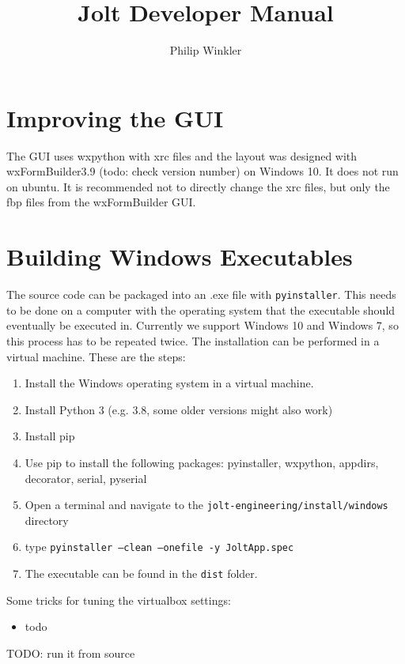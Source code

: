 \documentclass[]{article}
\title{Jolt Developer Manual}
\author{Philip Winkler}
\begin{document}
\maketitle

\section{Improving the GUI}
The GUI uses wxpython with xrc files and the layout was designed with wxFormBuilder3.9 (todo: check version number) on Windows 10. It does not run on ubuntu. It is recommended not to directly change the xrc files, but only the fbp files from the wxFormBuilder GUI.

\section{Building Windows Executables}
The source code can be packaged into an .exe file with \texttt{pyinstaller}. This needs to be done on a computer with the operating system that the executable should eventually be executed in. Currently we support Windows 10 and Windows 7, so this process has to be repeated twice. The installation can be performed in a virtual machine. 
These are the steps:
\begin{enumerate}
	\item Install the Windows operating system in a virtual machine.
	\item Install Python 3 (e.g. 3.8, some older versions might also work)
	\item Install pip
	\item Use pip to install the following packages: pyinstaller, wxpython, appdirs, decorator, serial, pyserial
	\item Open a terminal and navigate to the \texttt{jolt-engineering/install/windows} directory
	\item type \texttt{pyinstaller --clean --onefile -y JoltApp.spec}
	\item The executable can be found in the \texttt{dist} folder.
\end{enumerate}
Some tricks for tuning the virtualbox settings:
\begin{itemize}
	\item todo
\end{itemize}
TODO: run it from source
\end{document}
